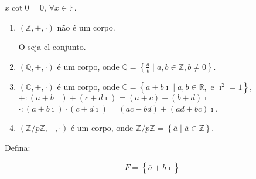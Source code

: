\begin{proposition}
	$x\cot0=0$, $\forall x\in\mathbb{F}$.
\end{proposition}

\begin{example}
	\begin{enumerate}
		\item

		      $\left(\mathbb{Z},+,\cdot\right)$ não é um corpo.

		      O seja el conjunto.

		\item

		      $\left(\mathbb{Q},+,\cdot\right)$ é um corpo, onde
		      $\mathbb{Q}=\left\{\frac{a}{b}\mid a,b\in\mathbb{Z},b\neq0\right\}$.

		\item

		      $\left(\mathbb{C},+,\cdot\right)$ é um corpo, onde
		      $\mathbb{C}=\left\{a+b\imath\mid a,b\in\mathbb{R},\text{ e }\imath^{2}=1\right\}$,
		      $+\colon\left(a+b\imath\right)+\left(c+d\imath\right)=\left(a+c\right)+\left(b+d\right)\imath$
		      $\cdot\colon\left(a+b\imath\right)\cdot\left(c+d\imath\right)=\left(ac-bd\right)+\left(ad+bc\right)\imath$.

		\item

		      $\left(\mathbb{Z}/p\mathbb{Z},+,\cdot\right)$ é um corpo, onde $\mathbb{Z}/p\mathbb{Z}=\left\{\overline{a}\mid \overline{a}\in\mathbb{Z}\right\}$.
	\end{enumerate}
\end{example}

Defina:

$$
F=\left\{\overline{a}+\overline{b}\imath\right\}
$$

